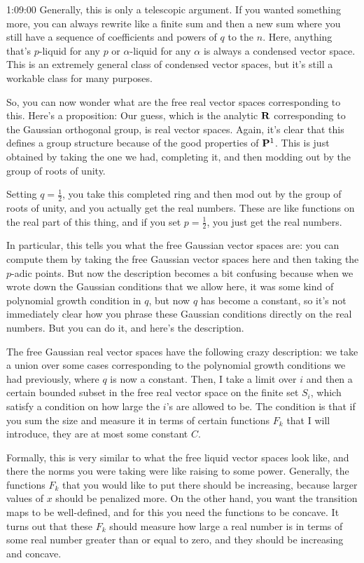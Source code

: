 \begin{unfinished}{1:09:00}
Generally, this is only a telescopic argument. If you wanted something more, you can always rewrite like a finite sum and then a new sum where you still have a sequence of coefficients and powers of $q$ to the $n$. Here, anything that's $p$-liquid for any $p$ or $\alpha$-liquid for any $\alpha$ is always a condensed vector space. This is an extremely general class of condensed vector spaces, but it's still a workable class for many purposes.

So, you can now wonder what are the free real vector spaces corresponding to this. Here's a proposition: Our guess, which is the analytic $\R$ corresponding to the Gaussian orthogonal group, is real vector spaces. Again, it's clear that this defines a group structure because of the good properties of $\P^1$. This is just obtained by taking the one we had, completing it, and then modding out by the group of roots of unity.

Setting $q = \frac{1}{2}$, you take this completed ring and then mod out by the group of roots of unity, and you actually get the real numbers. These are like functions on the real part of this thing, and if you set $p = \frac{1}{2}$, you just get the real numbers.

In particular, this tells you what the free Gaussian vector spaces are: you can compute them by taking the free Gaussian vector spaces here and then taking the
$p$-adic points. But now the description becomes a bit confusing because when we wrote down the Gaussian conditions that we allow here, it was some kind of polynomial growth condition in $q$, but now $q$ has become a constant, so it's not immediately clear how you phrase these Gaussian conditions directly on the real numbers. But you can do it, and here's the description.

The free Gaussian real vector spaces have the following crazy description: we take a union over some cases corresponding to the polynomial growth conditions we had previously, where $q$ is now a constant. Then, I take a limit over $i$ and then a certain bounded subset in the free real vector space on the finite set $S_i$, which satisfy a condition on how large the $i$'s are allowed to be. The condition is that if you sum the size and measure it in terms of certain functions $F_k$ that I will introduce, they are at most some constant $C$.

Formally, this is very similar to what the free liquid vector spaces look like, and there the norms you were taking were like raising to some power. Generally, the functions $F_k$ that you would like to put there should be increasing, because larger values of $x$ should be penalized more. On the other hand, you want the transition maps to be well-defined, and for this you need the functions to be concave. It turns out that these $F_k$ should measure how large a real number is in terms of some real number greater than or equal to zero, and they should be increasing and concave.



\end{unfinished}
